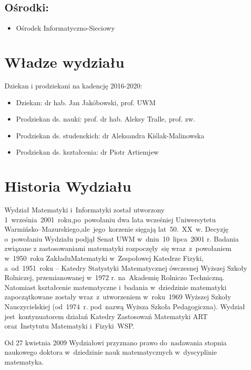 ﻿\documentclass[a4paper,12pt]{article}
\begin{document}
\subsection{Ośrodki:}
\begin{itemize}
	\item Ośrodek Informatyczno-Sieciowy
\end{itemize}


\section{Władze wydziału}
Dziekan i prodziekani na kadencję 2016-2020:
\begin{itemize}
	\item Dziekan: dr hab. Jan Jakóbowski, prof. UWM
	\item Prodziekan ds. nauki: prof. dr hab. Aleksy Tralle, prof. zw.
	\item Prodziekan ds. studenckich: dr Aleksandra Kiślak-Malinowska
	\item Prodziekan ds. kształcenia: dr Piotr Artiemjew
\end{itemize}

\section{Historia Wydziału}
Wydział Matematyki i~Informatyki został utworzony 1~września~2001~roku,\linebreak po~powołaniu dwa lata wcześniej Uniwersytetu Warmińsko--Mazurskiego,\linebreak ale~jego~korzenie sięgają lat~50.~XX~w. Decyzję o~powołaniu Wydziału podjął Senat UWM w~dniu~10~lipca~2001 r. Badania związane z zastosowania\-mi matematyki rozpoczęły~się wraz~z~powołaniem w~1950~roku Zakładu\linebreak Matematyki w~Zespołowej Katedrze Fizyki, a~od~1951~roku -- Katedry Statystyki Matematycznej ówczesnej Wyższej Szkoły Rolniczej, przemianowanej w~1972 r. na~Akademię Rolniczo Techniczną. Natomiast kształcenie matematyczne i~badania w~dziedzinie matematyki zapoczątkowane zostały wraz~z~utworzeniem w~roku~1969 Wyższej Szkoły Nauczycielskiej (od~1974~r. pod~nazwą Wyższa Szkoła Pedagogiczna). Wydział jest~kontynuatorem działań Katedry Zastosowań Matematyki ART oraz~Instytutu Matematyki i~Fizyki~WSP.

Od 27 kwietnia 2009 Wydziałowi przyznano prawo do~nadawania stopnia naukowego doktora w~dziedzinie nauk matematycznych w~dyscyplinie matematyka\cite{b3}.
\end{document}
